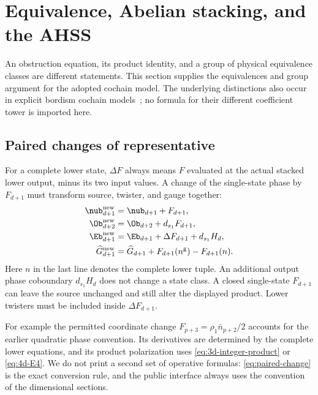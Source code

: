 \section{Equivalence, Abelian stacking, and the AHSS}\label{sec:coherence}
An obstruction equation, its product identity, and a group of physical equivalence classes are different statements. This section supplies the equivalences and group argument for the adopted cochain model. The underlying distinctions also occur in explicit bordism cochain models~\cite{BrumfielMorgan}; no formula for their different coefficient tower is imported here.

\subsection{Paired changes of representative}
For a complete lower state, $\Delta F$ always means $F$ evaluated at the actual stacked lower output, minus its two input values. A change of the single-state phase by $F_{d+1}$ must transform source, twister, and gauge together:
\begin{equation}\label{eq:paired-change}
 \begin{aligned}
 \nub_{d+1}^{\mathrm{new}}&=\nub_{d+1}+F_{d+1},\\
 \Ob_{d+2}^{\mathrm{new}}&=\Ob_{d+2}+d_{s_1}F_{d+1},\\
 \Eb_{d+1}^{\mathrm{new}}&=\Eb_{d+1}+\Delta F_{d+1}+d_{s_1}H_d,\\
 \widehat G_{d+1}^{\mathrm{new}}
 &=\widehat G_{d+1}+F_{d+1}(n^{\mathrm g})-F_{d+1}(n).
 \end{aligned}
\end{equation}
Here $n$ in the last line denotes the complete lower tuple. An additional output phase coboundary $d_{s_1}H_d$ does not change a state class. A closed single-state $F_{d+1}$ can leave the source unchanged and still alter the displayed product. Lower twisters must be included inside $\Delta F_{d+1}$.

For example the permitted coordinate change $F_{p+3}=\rho_1\bar n_{p+2}/2$ accounts for the earlier quadratic phase convention. Its derivatives are determined by the complete lower equations, and its product polarization uses \eqref{eq:3d-integer-product} or \eqref{eq:4d-E4}. We do not print a second set of operative formulas: \eqref{eq:paired-change} is the exact conversion rule, and the public interface always uses the convention of the dimensional sections.

